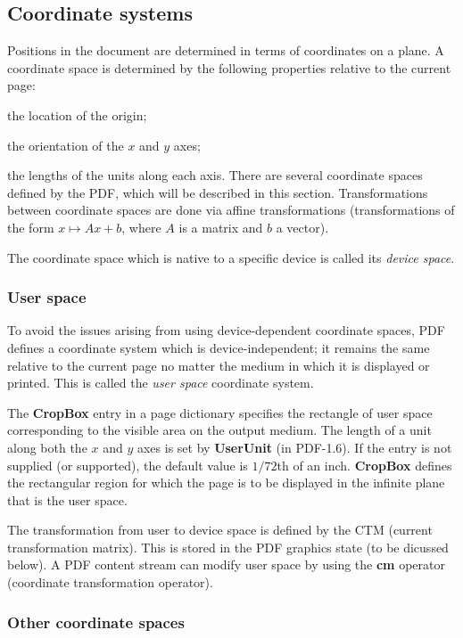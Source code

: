 \subsection{Coordinate systems}

Positions in the document are determined in terms of coordinates on a plane.
A coordinate space is determined by the following properties relative to the current page:
\blist
    \item the location of the origin;
    \item the orientation of the $x$ and $y$ axes;
    \item the lengths of the units along each axis.
\elist
There are several coordinate spaces defined by the PDF, which will be described in this section.
Transformations between coordinate spaces are done via affine transformations (transformations of the form
$x\mapsto Ax+b$, where $A$ is a matrix and $b$ a vector).

The coordinate space which is native to a specific device is called its {\it device space}.

\subsubsection{User space}

To avoid the issues arising from using device-dependent coordinate spaces, PDF defines a coordinate system
which is device-independent; it remains the same relative to the current page no matter the medium in which
it is displayed or printed.
This is called the {\it user space} coordinate system.

The {\bf CropBox} entry in a page dictionary specifies the rectangle of user space corresponding to the visible
area on the output medium.
The length of a unit along both the $x$ and $y$ axes is set by {\bf UserUnit} (in PDF-1.6).
If the entry is not supplied (or supported), the default value is $1/72$th of an inch.
{\bf CropBox} defines the rectangular region for which the page is to be displayed in the infinite plane that
is the user space.

The transformation from user to device space is defined by the CTM (current transformation matrix).
This is stored in the PDF graphics state (to be dicussed below).
A PDF content stream can modify user space by using the {\bf cm} operator (coordinate transformation
operator).

\subsubsection{Other coordinate spaces}

